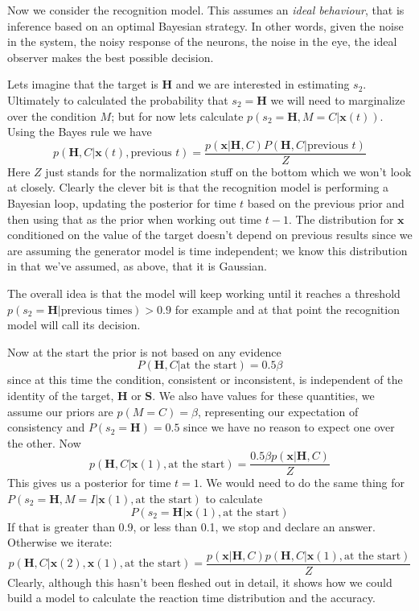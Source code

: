\documentclass[12pt]{article}
\begin{document}
Now we consider the recognition model. This assumes an \textsl{ideal
  behaviour}, that is inference based on an optimal Bayesian
strategy. In other words, given the noise in the system, the noisy
response of the neurons, the noise in the eye, the ideal observer
makes the best possible decision.

Lets imagine that the target is \textbf{H} and we are interested in
estimating $s_2$. Ultimately to calculated the probability that
$s_2=\mathbf{H}$ we will need to marginalize over the condition $M$;
but for now lets calculate $p(s_2=\mathbf{H},M=C|\textbf{x}(t))$.
Using the Bayes rule we have
\begin{equation}
p(\mathbf{H},C|\textbf{x}(t),\mbox{previous $t$})=\frac{p(\textbf{x}|\mathbf{H},C)P(\mathbf{H},C|\mbox{previous $t$})}{Z}
\end{equation}
Here $Z$ just stands for the normalization stuff on the bottom which
we won't look at closely. Clearly the clever bit is that the
recognition model is performing a Bayesian loop, updating the
posterior for time $t$ based on the previous prior and then using that
as the prior when working out time $t-1$. The distribution for
$\mathbf{x}$ conditioned on the value of the target doesn't depend on
previous results since we are assuming the generator model is time
independent; we know this distribution in that we've assumed, as
above, that it is Gaussian.

The overall idea is that the model will keep working until it reaches
a threshold $p(s_2=\mathbf{H}|\mbox{previous times})>0.9$ for example
and at that point the recognition model will call its decision.

Now at the start the prior is not based on any evidence
\begin{equation}
P(\mathbf{H},C|\mbox{at the start})=0.5\beta
\end{equation}
since at this time the condition, consistent or inconsistent, is
independent of the identity of the target, \textbf{H} or
\textbf{S}. We also have values for these quantities, we assume our
priors are $p(M=C)=\beta$, representing our expectation of consistency
and $P(s_2=\mathbf{H})=0.5$ since we have no reason to expect one over
the other. Now
\begin{equation}
p(\mathbf{H},C|\textbf{x}(1),\mbox{at the start})=\frac{0.5\beta p(\textbf{x}|\mathbf{H},C)}{Z}
\end{equation}
This gives us a posterior for time $t=1$. We would need to do the same
thing for $P(s_2=\mathbf{H},M=I|\textbf{x}(1),\mbox{at the start})$
to calculate 
\begin{equation}
P(s_2=\mathbf{H}|\textbf{x}(1),\mbox{at the
  start})
\end{equation}
If that is greater than 0.9, or less than 0.1, we stop and
declare an answer. Otherwise we iterate:
\begin{equation}
p(\mathbf{H},C|\textbf{x}(2),\textbf{x}(1),\mbox{at the start})=\frac{p(\textbf{x}|\mathbf{H},C)p(\mathbf{H},C|\textbf{x}(1),\mbox{at the start})}{Z}
\end{equation}
Clearly, although this hasn't been fleshed out in detail, it shows how
we could build a model to calculate the reaction time distribution and
the accuracy.
\end{document}

